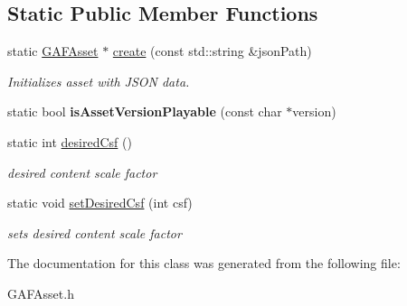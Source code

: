 \subsection*{Static Public Member Functions}
\begin{DoxyCompactItemize}
\item 
\hypertarget{class_g_a_f_1_1_g_a_f_asset_a339f17f57d9f1ee0aaf937bc04f68484}{static \hyperlink{class_g_a_f_1_1_g_a_f_asset}{G\-A\-F\-Asset} $\ast$ \hyperlink{class_g_a_f_1_1_g_a_f_asset_a339f17f57d9f1ee0aaf937bc04f68484}{create} (const std\-::string \&json\-Path)}\label{class_g_a_f_1_1_g_a_f_asset_a339f17f57d9f1ee0aaf937bc04f68484}

\begin{DoxyCompactList}\small\item\em Initializes asset with J\-S\-O\-N data. \end{DoxyCompactList}\item 
\hypertarget{class_g_a_f_1_1_g_a_f_asset_a003a54790c5f383bf72b2918ec14335f}{static bool {\bfseries is\-Asset\-Version\-Playable} (const char $\ast$version)}\label{class_g_a_f_1_1_g_a_f_asset_a003a54790c5f383bf72b2918ec14335f}

\item 
\hypertarget{class_g_a_f_1_1_g_a_f_asset_a76d2a115303d19e6543a009bd75e280e}{static int \hyperlink{class_g_a_f_1_1_g_a_f_asset_a76d2a115303d19e6543a009bd75e280e}{desired\-Csf} ()}\label{class_g_a_f_1_1_g_a_f_asset_a76d2a115303d19e6543a009bd75e280e}

\begin{DoxyCompactList}\small\item\em desired content scale factor \end{DoxyCompactList}\item 
\hypertarget{class_g_a_f_1_1_g_a_f_asset_afa4fb372779763d31793bdf73cf22dd8}{static void \hyperlink{class_g_a_f_1_1_g_a_f_asset_afa4fb372779763d31793bdf73cf22dd8}{set\-Desired\-Csf} (int csf)}\label{class_g_a_f_1_1_g_a_f_asset_afa4fb372779763d31793bdf73cf22dd8}

\begin{DoxyCompactList}\small\item\em sets desired content scale factor \end{DoxyCompactList}\end{DoxyCompactItemize}


The documentation for this class was generated from the following file\-:\begin{DoxyCompactItemize}
\item 
G\-A\-F\-Asset.\-h\end{DoxyCompactItemize}
